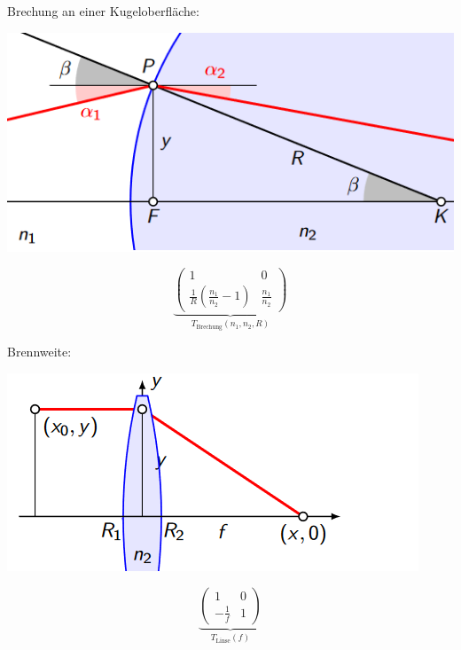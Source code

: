 \begin{minipage}{\textwidth}
	\noindent Brechung an einer Kugeloberfläche:
	
	\begin{minipage}{0.25\textwidth}
		\includegraphics[width=\linewidth,keepaspectratio=true]{./Images/optik_kugel.png}
	\end{minipage}%
	\begin{minipage}{0.25\textwidth}	
		\[
		\underbrace{
			\begin{pmatrix}
				1 & 0\\
				\frac{1}{R}\left(\frac{n_1}{n_2} - 1\right) & \frac{n_1}{n_2}
			\end{pmatrix}
		}_{T_{\text{Brechung}}(n_1,n_2,R)}
		\]
	\end{minipage}
\end{minipage}

\begin{minipage}{\textwidth}
	\noindent Brennweite:
	
	\begin{minipage}{0.25\textwidth}
		\includegraphics[width=\linewidth,keepaspectratio=true]{./Images/optik_brennweite.png}
	\end{minipage}%
	\begin{minipage}{0.25\textwidth}	
		\[\underbrace{
			\begin{pmatrix} 
				1 & 0 \\ 
				-\frac{1}{f} & 1
			\end{pmatrix}
		}_{T_{\text{Linse}}(f)}
		\]
	\end{minipage}
\end{minipage}

